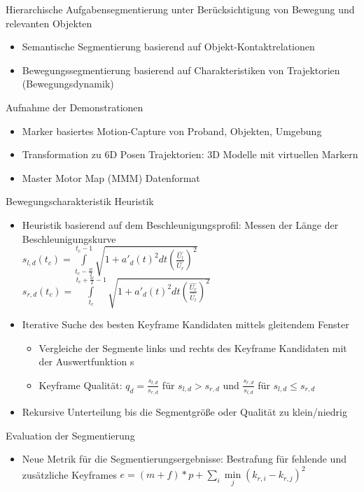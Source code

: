 \documentclass[paper=a4, fontsize=11pt]{scrartcl} %
\numberwithin{equation}{section} %
\numberwithin{figure}{section} %
\numberwithin{table}{section} %
\begin{document}
Hierarchische Aufgabensegmentierung unter Berücksichtigung von Bewegung und relevanten Objekten
\begin{itemize}
\item Semantische Segmentierung basierend auf Objekt-Kontaktrelationen
\item Bewegungssegmentierung basierend auf Charakteristiken von Trajektorien (Bewegungsdynamik)
\end{itemize}

Aufnahme der Demonstrationen
\begin{itemize}
\item Marker basiertes Motion-Capture von Proband, Objekten, Umgebung
\item Transformation zu 6D Posen Trajektorien: 3D Modelle mit virtuellen Markern
\item Master Motor Map (MMM) Datenformat
\end{itemize}

Bewegungscharakteristik Heuristik
\begin{itemize}
\item Heuristik basierend auf dem Beschleunigungsprofil: Messen der Länge der Beschleunigungskurve\\
$s_{l,d}(t_c) = \int\limits_{t_c-\frac{w}{2}}^{t_c-1} \sqrt{1 + a'_d(t)^2 dt (\frac{\hat{U_l}}{\hat{U_r}})^2}$\\
$s_{r,d}(t_c) = \int\limits_{t_c}^{t_c+\frac{w}{2}-1} \sqrt{1 + a'_d(t)^2 dt (\frac{\hat{U_r}}{\hat{U_l}})^2}$
\item Iterative Suche des besten Keyframe Kandidaten mittels gleitendem Fenster
\begin{itemize}
\item Vergleiche der Segmente links und rechts des Keyframe Kandidaten mit der Auswertfunktion s
\item Keyframe Qualität: $q_d = \frac{s_{l,d}}{s_{r,d}}$ für $s_{l,d} > s_{r,d}$ und $\frac{s_{r,d}}{s_{l,d}}$ für $s_{l,d} \le s_{r,d}$
\end{itemize}
\item Rekursive Unterteilung bis die Segmentgröße oder Qualität zu klein/niedrig 
\end{itemize}

Evaluation der Segmentierung
\begin{itemize}
\item Neue Metrik für die Segmentierungsergebnisse: Bestrafung für fehlende und zusätzliche Keyframes $e = (m + f) * p + \sum\limits_i \min\limits_j (k_{r,i} - k_{r,j})^2$
\end{itemize}
\end{document}
